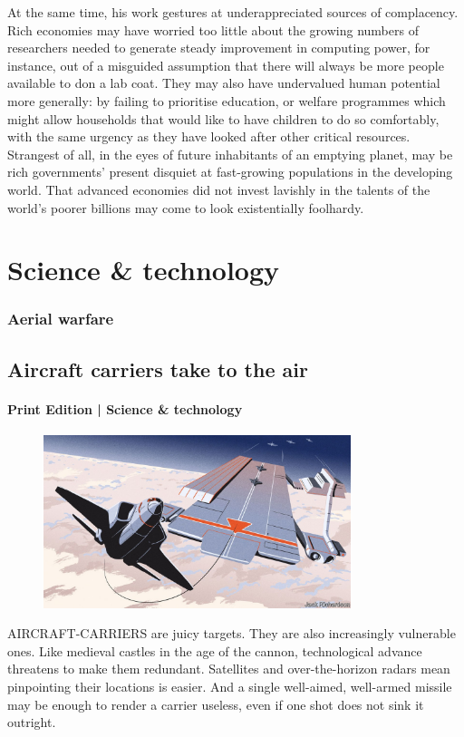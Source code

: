 \documentclass{article}
\begin{document}
At the same time, his work gestures at underappreciated sources of complacency. Rich economies may have worried too little about the growing numbers of researchers needed to generate steady improvement in computing power, for instance, out of a misguided assumption that there will always be more people available to don a lab coat. They may also have undervalued human potential more generally: by failing to prioritise education, or welfare programmes which might allow households that would like to have children to do so comfortably, with the same urgency as they have looked after other critical resources. Strangest of all, in the eyes of future inhabitants of an emptying planet, may be rich governments' present disquiet at fast-growing populations in the developing world. That advanced economies did not invest lavishly in the talents of the world's poorer billions may come to look existentially foolhardy. {} 
\clearpage
\section{Science \& technology }
\subsubsection{Aerial warfare }
\subsection{Aircraft carriers take to the air }
\paragraph{Print Edition | Science \& technology  \quad \color{gray}{Mar 25th 2021 }}
\begin{figure}[h]
\centering
\includegraphics[width=0.8\textwidth]{images/20210327_std001.jpg}
\end{figure}
\lettrine{A}IRCRAFT-CARRIERS are juicy targets. They are also increasingly vulnerable ones. Like medieval castles in the age of the cannon, technological advance threatens to make them redundant. Satellites and over-the-horizon radars mean pinpointing their locations is easier. And a single well-aimed, well-armed missile may be enough to render a carrier useless, even if one shot does not sink it outright. 
\end{document}
